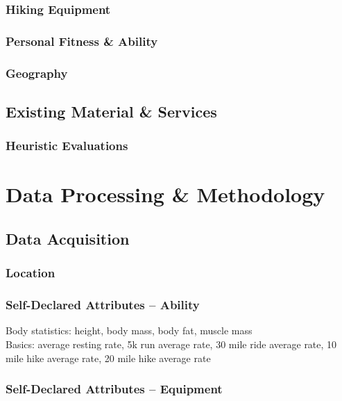 \documentclass[11pt, english]{article}
\begin{document}
		\subsubsection{Hiking Equipment}

		\subsubsection{Personal Fitness \& Ability}

		\subsubsection{Geography}

	\subsection{Existing Material \& Services}

		\subsubsection{Heuristic Evaluations}

\newpage

\section{Data Processing \& Methodology}\label{ch3}

	\subsection{Data Acquisition}

		\subsubsection{Location}

		\subsubsection{Self-Declared Attributes -- Ability}

		Body statistics: height, body mass, body fat, muscle mass\\

		Basics: average resting rate, 5k run average rate, 30 mile ride average rate, 10 mile hike average rate, 20 mile hike average rate

		\subsubsection{Self-Declared Attributes -- Equipment}
\end{document}
